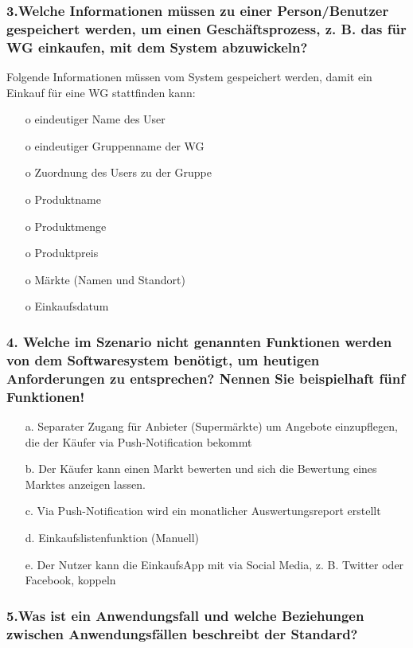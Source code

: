 \documentclass[12pt,a4paper]{article}
\begin{document}
\subsubsection*{3.Welche Informationen müssen zu einer Person/Benutzer gespeichert werden, um einen Geschäftsprozess, z. B. das für WG einkaufen, mit dem System abzuwickeln?}

Folgende Informationen müssen vom System gespeichert werden, damit ein Einkauf für eine WG stattfinden kann:
\begin{itemize} 
\item[o] eindeutiger Name des User
\item[o] eindeutiger Gruppenname der WG
\item[o] Zuordnung des Users zu der Gruppe
\item[o] Produktname
\item[o] Produktmenge
\item[o] Produktpreis
\item[o] Märkte (Namen und Standort)
\item[o] Einkaufsdatum
\end{itemize}
 
\subsubsection*{4. Welche im Szenario nicht genannten Funktionen werden von dem Softwaresystem benötigt, um heutigen Anforderungen zu entsprechen? Nennen Sie beispielhaft fünf Funktionen!}
\begin{itemize}
\item[a.] Separater Zugang für Anbieter (Supermärkte) um Angebote einzupflegen, die der Käufer via Push-Notification bekommt
\item[b.] Der Käufer kann einen Markt bewerten und sich die Bewertung eines Marktes anzeigen lassen.
\item[c.] Via Push-Notification wird ein monatlicher Auswertungsreport erstellt
\item[d.] Einkaufslistenfunktion (Manuell)
\item[e.] Der Nutzer kann die EinkaufsApp mit via Social Media, z. B. Twitter oder Facebook, koppeln
\end{itemize}
 
 
\subsubsection*{5.Was ist ein Anwendungsfall und welche Beziehungen zwischen Anwendungsfällen beschreibt der Standard?}
\end{document}
